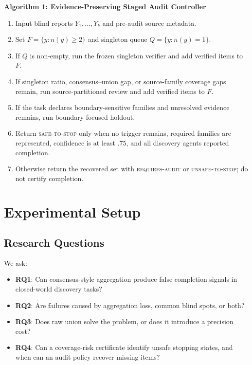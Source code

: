 \documentclass[letterpaper]{article}
\begin{document}
\begin{table}[t]
\centering
\footnotesize
\begin{minipage}{0.96\columnwidth}
\textbf{Algorithm 1: Evidence-Preserving Staged Audit Controller}

\begin{enumerate}
    \item Input blind reports $Y_1,\ldots,Y_k$ and pre-audit source metadata.
    \item Set $F=\{y:n(y)\ge2\}$ and singleton queue $Q=\{y:n(y)=1\}$.
    \item If $Q$ is non-empty, run the frozen singleton verifier and add
    verified items to $F$.
    \item If singleton ratio, consensus--union gap, or source-family coverage
    gaps remain, run source-partitioned review and add verified items to $F$.
    \item If the task declares boundary-sensitive families and unresolved
    evidence remains, run boundary-focused holdout.
    \item Return \textsc{safe-to-stop} only when no trigger remains, required
    families are represented, confidence is at least .75, and all discovery
    agents reported completion.
    \item Otherwise return the recovered set with \textsc{requires-audit} or
    \textsc{unsafe-to-stop}; do not certify completion.
\end{enumerate}
\end{minipage}
\caption{Frozen staged controller used for held-out online validation. Oracle
labels are never used by the controller; they are used only after logging for
offline scoring.}
\label{alg:staged-controller}
\end{table}

\section{Experimental Setup}

\subsection{Research Questions}

We ask:

\begin{itemize}
    \item \textbf{RQ1}: Can consensus-style aggregation produce false completion
    signals in closed-world discovery tasks?
    \item \textbf{RQ2}: Are failures caused by aggregation loss, common blind
    spots, or both?
    \item \textbf{RQ3}: Does raw union solve the problem, or does it introduce a
    precision cost?
    \item \textbf{RQ4}: Can a coverage-risk certificate identify unsafe
    stopping states, and when can an audit policy recover missing items?
\end{itemize}
\end{document}

